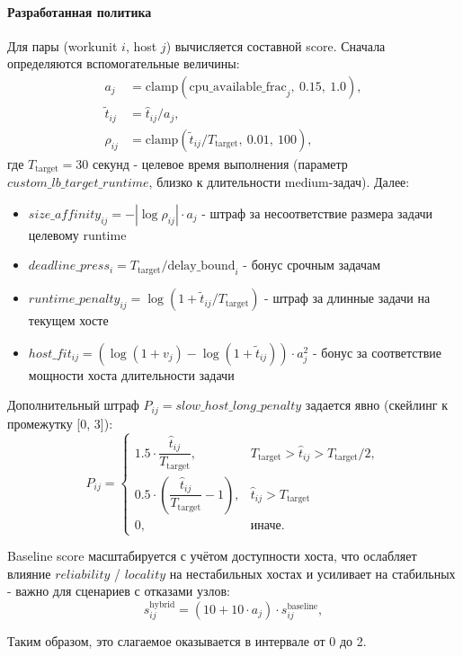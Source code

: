 \documentclass[a4paper,12pt]{extarticle}
\begin{document}
\paragraph{Разработанная политика}
Для пары (workunit $i$, host $j$) вычисляется составной score. Сначала определяются вспомогательные величины:
\begin{align*}
    a_j &= \mathrm{clamp}(\text{cpu\_available\_frac}_j,\ 0.15,\ 1.0), \\
    \tilde{t}_{ij} &= \hat{t}_{ij} / a_j, \\
    \rho_{ij} &= \mathrm{clamp}(\tilde{t}_{ij} / T_{\text{target}},\ 0.01,\ 100),
\end{align*}
где $T_{\text{target}} = 30$ секунд - целевое время выполнения (параметр $custom\_lb\_target\_runtime$, близко к длительности medium-задач). Далее:
\begin{itemize}
    \item $size\_affinity_{ij} = -|\log \rho_{ij}| \cdot a_j$ - штраф за несоответствие размера задачи целевому runtime
    \item $deadline\_press_i = T_{\text{target}} / \text{delay\_bound}_i$ - бонус срочным задачам
    \item $runtime\_penalty_{ij} = \log(1 + \tilde{t}_{ij} / T_{\text{target}})$ - штраф за длинные задачи на текущем хосте
    \item $host\_fit_{ij} = (\log(1 + v_j) - \log(1 + \tilde{t}_{ij})) \cdot a_j^2$ - бонус за соответствие мощности хоста длительности задачи
\end{itemize}
Дополнительный штраф $P_{ij}=slow\_host\_long\_penalty$ задается явно (скейлинг к промежутку [0, 3]):
\[
P_{ij}=\begin{cases}
1.5\cdot\dfrac{\hat t_{ij}}{T_{\mathrm{target}}},
 & T_{\mathrm{target}}>\hat t_{ij}>T_{\mathrm{target}}/2,\\[3pt]
0.5\cdot\left(\dfrac{\hat t_{ij}}{T_{\mathrm{target}}}-1\right),
 & \hat t_{ij}>T_{\mathrm{target}}\\[3pt]
0, & \text{иначе}.
\end{cases}
\]

Baseline score масштабируется с учётом доступности хоста, что ослабляет влияние $reliability$ / $locality$ на нестабильных хостах и усиливает на стабильных - важно для сценариев с отказами узлов:
\[
    s^{\text{hybrid}}_{ij} = (10 + 10 \cdot a_j) \cdot s^{\text{baseline}}_{ij},
\]

Таким образом, это слагаемое оказывается в интервале от 0 до 2.
\end{document}

